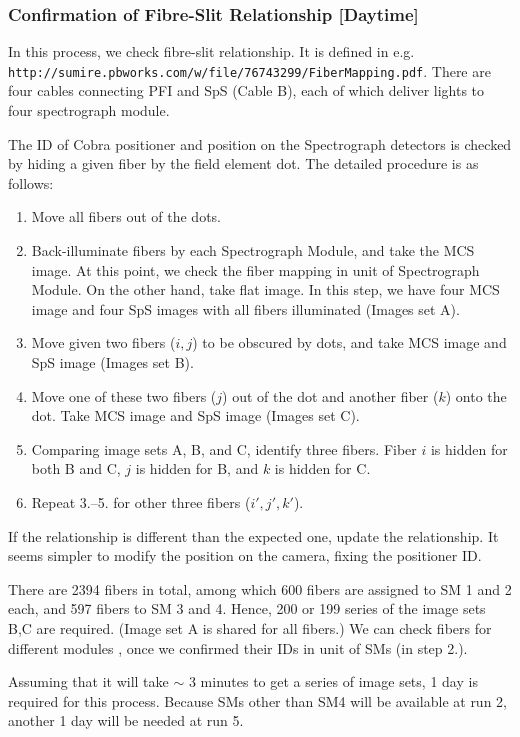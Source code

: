 \subsubsection{Confirmation of Fibre-Slit Relationship [Daytime]}\label{secflow:FibID}

In this process, we check fibre-slit relationship.
It is defined in e.g. \\
 {\tt http://sumire.pbworks.com/w/file/76743299/FiberMapping.pdf}.
There are four cables connecting PFI and SpS (Cable B), each of which deliver lights to four spectrograph module.

The ID of Cobra positioner and position on the Spectrograph detectors is checked by hiding a given fiber by the field element dot. 
The detailed procedure is as follows:
\begin{enumerate}
\item Move all fibers out of the dots.
\item Back-illuminate fibers by each Spectrograph Module, and take the MCS image.
At this point, we check the fiber mapping in unit of Spectrograph Module. 
On the other hand, take flat image.
In this step, we have four MCS image and four SpS images with all fibers illuminated (Images set A).
\item Move given two fibers ($i, j$) to be obscured by dots, and take MCS image and SpS image (Images set B).
\item Move one of these two fibers ($j$) out of the dot and another fiber ($k$) onto the dot. 
Take MCS image and SpS image (Images set C).
\item Comparing image sets A, B, and C, identify three fibers.
Fiber $i$ is hidden for both B and C, $j$ is hidden for B, and $k$ is hidden for C.
\item Repeat 3.--5. for other three fibers ($i', j', k'$).
\end{enumerate} 
If the relationship is different than the expected one, update the relationship.
It seems simpler to modify the position on the camera, fixing the positioner ID.

There are 2394 fibers in total, among which 600 fibers are assigned to SM 1 and 2 each, and 597 fibers to SM 3 and 4.
Hence, 200 or 199 series of the image sets B,C are required. 
(Image set A is shared for all fibers.)
We can check fibers for different modules , once we confirmed their IDs in unit of SMs (in step 2.).

Assuming that it will take $\sim$ 3 minutes to get a series of image sets, 1 day is required for this process.
Because SMs other than SM4 will be available at run 2, another 1 day will be needed at run 5.


